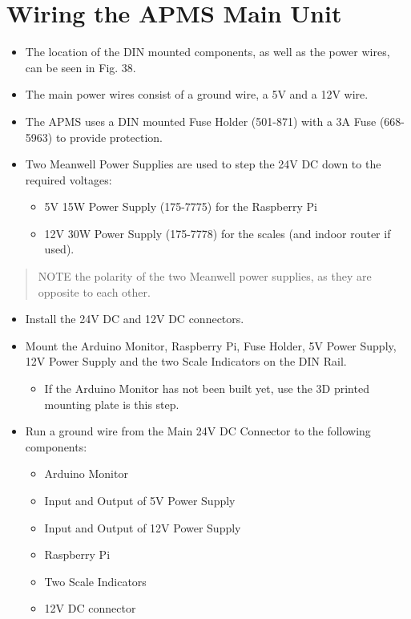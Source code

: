\documentclass[
  letterpaper,
]{scrbook}
\providecommand{\tightlist}{%
  \setlength{\itemsep}{0pt}\setlength{\parskip}{0pt}}
\begin{document}
\section{Wiring the APMS Main Unit}\label{wiring-the-apms-main-unit}

\begin{itemize}
\item
  The location of the DIN mounted components, as well as the power
  wires, can be seen in Fig. 38.
\item
  The main power wires consist of a ground wire, a 5V and a 12V wire.
\item
  The APMS uses a DIN mounted Fuse Holder (501-871) with a 3A Fuse
  (668-5963) to provide protection.
\item
  Two Meanwell Power Supplies are used to step the 24V DC down to the
  required voltages:

  \begin{itemize}
  \item
    5V 15W Power Supply (175-7775) for the Raspberry Pi
  \item
    12V 30W Power Supply (175-7778) for the scales (and indoor router if
    used).
  \end{itemize}
\end{itemize}

\begin{quote}
NOTE the polarity of the two Meanwell power supplies, as they are
opposite to each other.
\end{quote}

\begin{itemize}
\item
  Install the 24V DC and 12V DC connectors.
\item
  Mount the Arduino Monitor, Raspberry Pi, Fuse Holder, 5V Power Supply,
  12V Power Supply and the two Scale Indicators on the DIN Rail.

  \begin{itemize}
  \tightlist
  \item
    If the Arduino Monitor has not been built yet, use the 3D printed
    mounting plate is this step.
  \end{itemize}
\item
  Run a ground wire from the Main 24V DC Connector to the following
  components:

  \begin{itemize}
  \item
    Arduino Monitor
  \item
    Input and Output of 5V Power Supply
  \item
    Input and Output of 12V Power Supply
  \item
    Raspberry Pi
  \item
    Two Scale Indicators
  \item
    12V DC connector
  \end{itemize}
\end{itemize}
\end{document}
